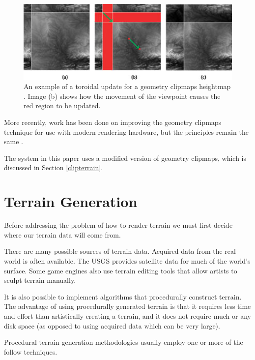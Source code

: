 \begin{figure}
	\centering
		\includegraphics[width=1.0\textwidth]{figures/clipmaps_update.jpg}
	\caption{
		An example of a toroidal update for a geometry clipmaps heightmap \cite{geometry_clipmaps}.
		Image (b) shows how the movement of the viewpoint causes the red region to be updated.
	}
	\label{fig:clipmaps_update}
\end{figure}

More recently, work has been done on improving the geometry clipmaps technique for use with modern rendering hardware, but the principles remain the same \cite{gems_clipmaps}.

The system in this paper uses a modified version of geometry clipmaps, which is discussed in Section \ref{clipterrain}.

\section{Terrain Generation} \label{terrain_gen}

Before addressing the problem of how to render terrain we must first decide where our terrain data will come from.

There are many possible sources of terrain data.
Acquired data from the real world is often available.
The USGS provides satellite data for much of the world's surface.
Some game engines also use terrain editing tools that allow artists to sculpt terrain manually.

It is also possible to implement algorithms that procedurally construct terrain.
The advantage of using procedurally generated terrain is that it requires less time and effort  than artistically creating a terrain, and it does not require much or any disk space (as opposed to using acquired data which can be very large).

Procedural terrain generation methodologies usually employ one or more of the follow techniques.

